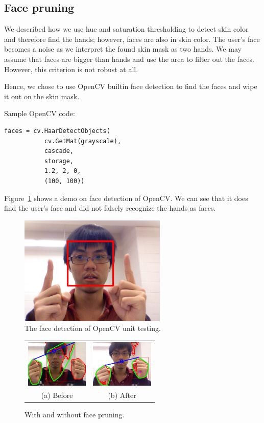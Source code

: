 \documentclass[10pt,twocolumn,letterpaper]{article}
\begin{document}
\subsection{Face pruning}
\label{sec:face}
We described how we use hue and saturation thresholding to detect skin
 color and therefore find the hands; however, faces are also in skin color. 
 The user's face becomes a noise as we interpret the found skin mask as 
 two hands. We may assume that faces are bigger than hands and use 
 the area to filter out the faces. However, this criterion is not robust at all.

 Hence, we chose to use OpenCV builtin face detection to find the faces 
 and wipe it out on the skin mask.

Sample OpenCV code:
 \begin{verbatim}
faces = cv.HaarDetectObjects(
           cv.GetMat(grayscale), 
           cascade, 
           storage, 
           1.2, 2, 0, 
           (100, 100))
 \end{verbatim}

Figure~\ref{fig:facedetect} shows a demo on face detection of OpenCV. 
We can see that it does find the user's face and did not 
falsely recognize the hands as faces.

 \begin{figure}[h]
 \centering
 \includegraphics[width=7cm]{facedetection.png}
 \caption{The face detection of OpenCV unit testing. }
 \label{fig:facedetect}
 \end{figure}

 \begin{figure}[h]
 \centering
 \begin{tabular}{cc}
 \includegraphics[width=3cm]{without_prune_face.png} &
 \includegraphics[width=3cm]{after_face_prune.png} \\
 (a) Before &
 (b) After
 \end{tabular}
 \caption{With and without face pruning.}
 \label{fig:faceprune}
 \end{figure}
\end{document}
